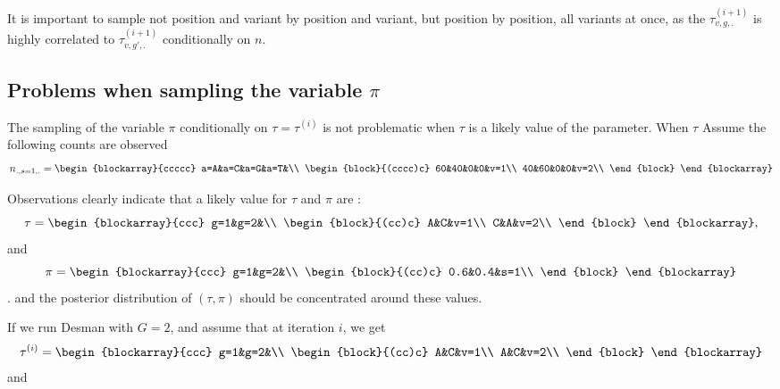 \documentclass{article}
\begin{document}
It is important to sample not position and variant by position and variant, but position by position, all variants at once, as the $\tau^{(i+1)}_{v,g,.}$ is highly correlated to $\tau^{(i+1)}_{v,g',.}$ conditionally on $n$.

\subsection{Problems when sampling the variable $\pi$}
The sampling of the variable $\pi$ conditionally on $\tau=\tau^{(i)}$ is not problematic when $\tau$ is a likely value of the parameter.
When $\tau$
Assume the following counts are observed 
$$n_{.,s=1,.}=\begin{blockarray}{ccccc}
    a=A&a=C&a=G&a=T&\\
    \begin{block}{(cccc)c}
    60&40&0&0&v=1\\
    40&60&0&0&v=2\\
    \end{block}
\end{blockarray}$$

Observations clearly indicate that a likely value for $\tau$ and $\pi$ are :
$$\tau=\begin{blockarray}{ccc}
    g=1&g=2&\\
    \begin{block}{(cc)c}
    A&C&v=1\\
    C&A&v=2\\
    \end{block}
\end{blockarray},$$ 
and $$\pi=\begin{blockarray}{ccc}
    g=1&g=2&\\
    \begin{block}{(cc)c}
    0.6&0.4&s=1\\
    \end{block}
\end{blockarray}$$.
and the posterior distribution of $(\tau,\pi)$ should be concentrated around these values.

If we run Desman with $G=2$, and assume that at iteration $i$, we get 
$$\tau^{(i)}=\begin{blockarray}{ccc}
    g=1&g=2&\\
    \begin{block}{(cc)c}
    A&C&v=1\\
    A&C&v=2\\
    \end{block}
\end{blockarray}$$ and 
\end{document}
